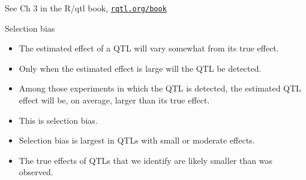 \documentclass[12pt]{article}
\newcommand{\headsize}{\fontsize{35}{35} \selectfont}
\newcommand{\smallsize}{\fontsize{25}{30} \selectfont}
\newcommand{\smallestsize}{\fontsize{18}{22} \selectfont}
\begin{document}
\vspace{15mm}

\centerline{\color{myblue} See Ch 3 in the R/qtl book,
  \href{http://rqtl.org/book}{\tt rqtl.org/book}}



\newpage

\headsize \color{myyellow}
\hfill \begin{minipage}{5.75in}
\centering
Selection bias
\end{minipage}

\vspace{15mm}

\color{mywhite} \smallsize

\hspace*{0.5in}
\begin{minipage}[t]{4.1in}
\vspace*{5mm}

\sloppy
\smallestsize
\begin{itemize}
\setlength{\rightskip}{0pt plus 1fil} %
\item The estimated effect of a QTL will vary somewhat from its true
effect.
\item Only when the estimated effect is large will the QTL be
detected.
\item Among those experiments in which the QTL is detected, the estimated
QTL effect will be, on average, larger than its true effect.
\item This is {\color{mypink} selection bias}.
\item Selection bias is largest in QTLs with small or moderate effects.
\item The true effects of QTLs that we identify are likely smaller
than was observed.
\end{itemize}
\end{minipage}
\hfill
\end{document}
